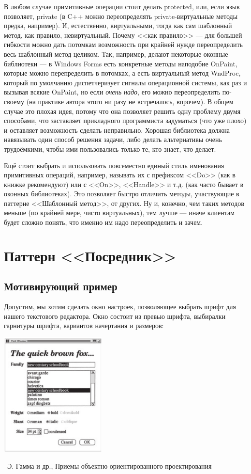 \documentclass[a5paper]{article}
\newcommand{\attribution}[1] {
    \vspace{-5mm}\begin{flushright}\begin{scriptsize}%
    {\textcopyright\, #1}\end{scriptsize}\end{flushright}
}
\begin{document}
В любом случае примитивные операции стоит делать protected, или, если язык позволяет, private (в C++ можно переопределять private-виртуальные методы предка, например). И, естественно, виртуальными, тогда как сам шаблонный метод, как правило, невиртуальный. Почему <<как правило>> --- для большей гибкости можно дать потомкам возможность при крайней нужде переопределить весь шаблонный метод целиком. Так, например, делают некоторые оконные библиотеки --- в Windows Forms есть конкретные методы наподобие OnPaint, которые можно перепределить в потомках, а есть виртуальный метод WndProc, который по умолчанию диспетчеризует сигналы операционной системы, как раз и вызывая всякие OnPaint, но если \emph{очень надо}, его можно переопределить по-своему (на практике автора этого ни разу не встречалось, впрочем). В общем случае это плохая идея, потому что она позволяет решить одну проблему двумя способами, что заставляет прикладного программиста задуматься (что уже плохо) и оставляет возможность сделать неправильно. Хорошая библиотека должна навязывать один способ решения задачи, либо делать альтернативы очень трудоёмкими, чтобы ими пользовались только те, кто знает, что делает.

Ещё стоит выбрать и использовать повсеместно единый стиль именования примитивных операций, например, называть их с префиксом <<Do>> (как в книжке рекомендуют) или с <<On>>, <<Handle>> и т.д. (как часто бывает в оконных библиотеках). Это позволяет быстро отличить методы, участвующие в паттерне <<Шаблонный метод>>, от других. Ну и, конечно, чем таких методов меньше (по крайней мере, чисто виртуальных), тем лучше --- иначе клиентам будет сложно понять, что именно им надо переопределить и зачем.

\section{Паттерн <<Посредник>>}

\subsection{Мотивирующий пример}

Допустим, мы хотим сделать окно настроек, позволяющее выбрать шрифт для нашего текстового редактора. Окно состоит из превью шрифта, выбиралки гарнитуры шрифта, вариантов начертания и размеров:

\begin{center}
    \includegraphics[width=0.4\textwidth]{mediatorMotivation.png}
    \attribution{Э. Гамма и др., Приемы объектно-ориентированного проектирования}
\end{center}
\end{document}
